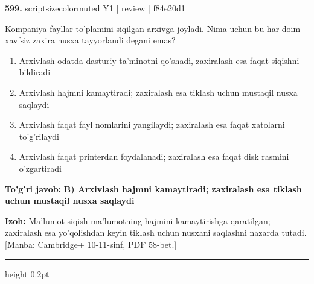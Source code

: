 \documentclass[10pt,a4paper]{article}
\begin{document}
{\bfseries\sffamily\color{ink} 599.} {scriptsizecolor{muted} Y1 | review | f84e20d1}
\par
Kompaniya fayllar to'plamini siqilgan arxivga joyladi. Nima uchun bu har doim xavfsiz zaxira nusxa tayyorlandi degani emas?
\begin{enumerate}[label=\Alph*),leftmargin=9mm]
\item Arxivlash odatda dasturiy ta'minotni qo'shadi, zaxiralash esa faqat siqishni bildiradi
\item Arxivlash hajmni kamaytiradi; zaxiralash esa tiklash uchun mustaqil nusxa saqlaydi
\item Arxivlash faqat fayl nomlarini yangilaydi; zaxiralash esa faqat xatolarni to'g'rilaydi
\item Arxivlash faqat printerdan foydalanadi; zaxiralash esa faqat disk rasmini o'zgartiradi
\end{enumerate}
\begin{tcolorbox}[enhanced,breakable,colback=teal!4,colframe=teal!60!black,boxrule=0.45pt,arc=1.2mm,left=2.7mm,right=2.7mm,top=1.8mm,bottom=1.8mm,before skip=2mm,after skip=2mm]
{\bfseries\sffamily\color{teal}To'g'ri javob:} \textbf{B) Arxivlash hajmni kamaytiradi; zaxiralash esa tiklash uchun mustaqil nusxa saqlaydi}
\par\smallskip
{\bfseries Izoh:} Ma'lumot siqish ma'lumotning hajmini kamaytirishga qaratilgan; zaxiralash esa yo'qolishdan keyin tiklash uchun nusxani saqlashni nazarda tutadi. [Manba: Cambridge+ 10-11-sinf, PDF 58-bet.]
\end{tcolorbox}
\vspace{2mm}\hrule height 0.2pt\vspace{3mm}
\end{document}
